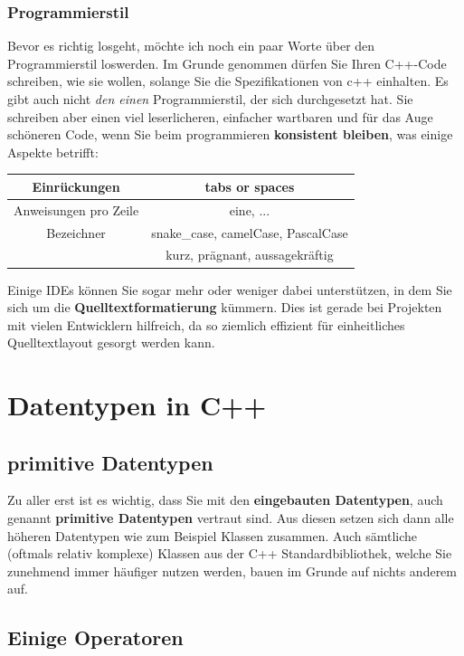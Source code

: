 \documentclass[a4paper]{report}
\begin{document}
\subsection{Programmierstil}
Bevor es richtig losgeht, möchte ich noch ein paar Worte über den Programmierstil loswerden. Im Grunde genommen dürfen Sie Ihren C++-Code schreiben, wie sie wollen, solange Sie die Spezifikationen von c++ einhalten. Es gibt auch nicht \textit{den einen} Programmierstil, der sich durchgesetzt hat. Sie schreiben aber einen viel leserlicheren, einfacher wartbaren und für das Auge schöneren Code, wenn Sie beim programmieren \textbf{konsistent bleiben}, was einige Aspekte betrifft:
\begin{center}
	\begin{tabular}{|c||c|}
		\hline
		Einrückungen	&	tabs or spaces \\ \hline
		Anweisungen pro Zeile & eine, ... \\ \hline
		Bezeichner		&	snake\_case, camelCase, PascalCase \\
		& kurz, prägnant, aussagekräftig \\ \hline
	\end{tabular}
\end{center}
Einige IDEs können Sie sogar mehr oder weniger dabei unterstützen, in dem Sie sich um die \textbf{Quelltextformatierung} kümmern. Dies ist gerade bei Projekten mit vielen Entwicklern hilfreich, da so ziemlich effizient für einheitliches Quelltextlayout gesorgt werden kann.

\chapter{Datentypen in C++} \label{real_start}

\section{primitive Datentypen}
Zu aller erst ist es wichtig, dass Sie mit den \textbf{eingebauten Datentypen}, auch genannt \textbf{primitive Datentypen} vertraut sind. Aus diesen setzen sich dann alle höheren Datentypen wie zum Beispiel Klassen zusammen. Auch sämtliche (oftmals relativ komplexe) Klassen aus der C++ Standardbibliothek, welche Sie zunehmend immer häufiger nutzen werden, bauen im Grunde auf nichts anderem auf.

\section{Einige Operatoren}
\end{document}
